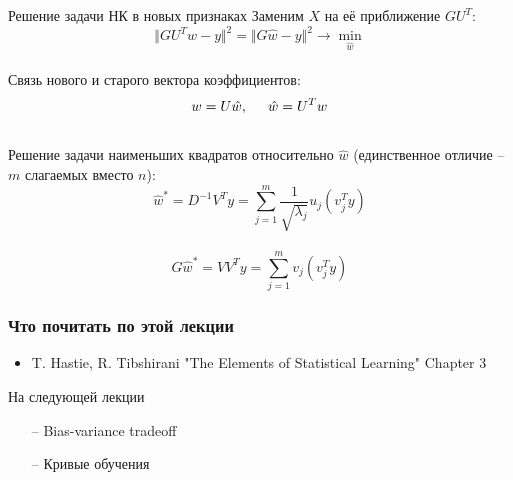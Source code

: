 \documentclass[10pt]{beamer}
\begin{document}
\begin{frame}{Решение задачи НК в новых признаках}
	Заменим $X$ на её приближение $GU^T$:\\
	$$\Vert GU^Tw -y \Vert^2 = \Vert G\hat{w} -y \Vert^2 \rightarrow \min\limits_{\hat{w}}$$\\
	Связь нового и старого вектора коэффициентов:\\
	$$w = U\hat{w}, \hspace{5mm} \hat{w} = U^T w$$\\
	\pause
	\bigbreak
	Решение задачи наименьших квадратов относительно $\hat{w}$ (единственное отличие -- $m$ слагаемых вместо $n$):\\
	$$\hat{w}^* = D^{-1}V^Ty = \sum\limits_{j=1}^m \frac{1}{\sqrt{\lambda_j}} u_j (v_j^Ty)$$\\
	$$G\hat{w}^* = VV^Ty = \sum\limits_{j=1}^m v_j (v_j^Ty)$$
\end{frame}

\begin{frame}\frametitle{Что почитать по этой лекции}
  \begin{itemize}
    \item T. Hastie, R. Tibshirani "The Elements of Statistical Learning" Chapter 3
  \end{itemize}
\end{frame}

\begin{frame}{На следующей лекции}
	\begin{itemize}
    	\item[--] Bias-variance tradeoff
    	\item[--] Кривые обучения 
	\end{itemize}
\end{frame}
\end{document}
